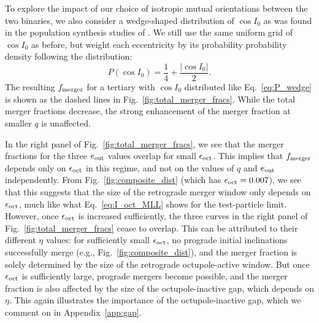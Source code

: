 \documentclass[
        fleqn,
        usenatbib,
    ]{mnras}
\newcommand*{\abs}[1]{\left|#1\right|}
\newcommand*{\p}[1]{\left(#1\right)}
\begin{document}
To explore the impact of our choice of isotropic mutual
orientations between the two binaries, we also consider a wedge-shaped
distribution of $\cos I_0$ as was found in the population synthesis studies of
\citet{antonini2017binary}. We still use the same uniform grid of $\cos I_0$ as
before, but weight each eccentricity by its probability probability density
following the distribution:
\begin{equation}
    P\p{\cos I_0} = \frac{1}{4} + \frac{\abs{\cos I_0}}{2}.\label{eq:P_wedge}
\end{equation}
The resulting $f_{\rm merger}$ for a tertiary with $\cos I_0$ distributed like
Eq.~\eqref{eq:P_wedge} is shown as the dashed lines in
Fig.~\ref{fig:total_merger_fracs}. While the total merger fractions decrease,
the strong enhancement of the merger fraction at smaller $q$ is unaffected.

In the right panel of Fig.~\ref{fig:total_merger_fracs}, we see that the merger
fractions for the three $e_{\rm out}$ values overlap for small $\epsilon_{\rm
oct}$. This implies that $f_{\rm merger}$ depends only on $\epsilon_{\rm oct}$
in this regime, and not on the values of $q$ and $e_{\rm out}$ independently.
From Fig.~\ref{fig:composite_dist} (which has $\epsilon_{\rm oct} = 0.007$), we
see that this suggests that the size of the retrograde merger window only
depends on $\epsilon_{\rm oct}$, much like what Eq.~\eqref{eq:I_oct_MLL} shows
for the test-particle limit. However, once $\epsilon_{\rm oct}$ is increased
sufficiently, the three curves in the right panel of
Fig.~\ref{fig:total_merger_fracs} cease to overlap. This can be attributed to
their different $\eta$ values: for sufficiently small $\epsilon_{\rm oct}$, no
prograde initial inclinations successfully merge (e.g.,
Fig.~\ref{fig:composite_dist}), and the merger fraction is solely determined by
the size of the retrograde octupole-active window. But once $\epsilon_{\rm oct}$
is sufficiently large, prograde mergers become possible, and the merger fraction
is also affected by the size of the octupole-inactive gap, which depends on
$\eta$. This again illustrates the importance of the octupole-inactive gap,
which we comment on in Appendix~\ref{app:gap}.
\end{document}

